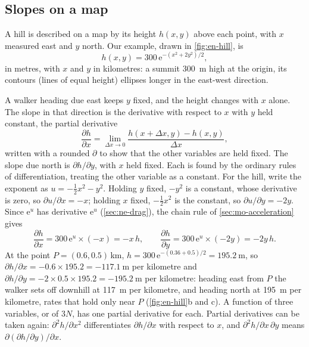 \subsection*{Slopes on a map}

A hill is described on a map by its height $h(x, y)$ above each point,
with $x$ measured east and $y$ north. Our example, drawn in
\cref{fig:en-hill}, is
\begin{equation*}
   h(x, y) = 300\,\mathrm{e}^{-(x^2 + 2y^2)/2} ,
\end{equation*}
in metres, with $x$ and $y$ in kilometres: a summit \SI{300}{\metre} high
at the origin, its contours (lines of equal height) ellipses longer in
the east-west direction.

\begin{toolbox}
A walker heading due east keeps $y$ fixed, and the height changes with
$x$ alone. The slope in that direction is the derivative with respect to
$x$ with $y$ held constant, the partial derivative
\begin{equation*}
   \frac{\partial h}{\partial x}
   = \lim_{\Delta x\to0}\frac{h(x + \Delta x, y) - h(x, y)}{\Delta x} ,
\end{equation*}
written with a rounded $\partial$ to show that the other variables are
held fixed. The slope due north is $\partial h/\partial y$, with $x$ held
fixed. Each is found by the ordinary rules of differentiation, treating
the other variable as a constant. For the hill, write the exponent as $u
= -\tfrac12 x^2 - y^2$. Holding $y$ fixed, $-y^2$ is a constant, whose
derivative is zero, so $\partial u/\partial x = -x$; holding $x$ fixed,
$-\tfrac12 x^2$ is the constant, so $\partial u/\partial y = -2y$. Since
$\mathrm{e}^u$ has derivative $\mathrm{e}^u$ (\cref{sec:ne-drag}), the
chain rule of \cref{sec:mo-acceleration} gives
\begin{equation*}
   \frac{\partial h}{\partial x} = 300\,\mathrm{e}^{u}\times(-x) = -x\,h ,
   \qquad
   \frac{\partial h}{\partial y} = 300\,\mathrm{e}^{u}\times(-2y)
   = -2y\,h .
\end{equation*}
At the point $P = (0.6, 0.5)$\,\si{\kilo\metre}, $h =
300\,\mathrm{e}^{-(0.36 + 0.5)/2} = \SI{195.2}{\metre}$, so $\partial
h/\partial x = -0.6\times195.2 = \SI{-117.1}{\metre}$ per kilometre and
$\partial h/\partial y = -2\times0.5\times195.2 = \SI{-195.2}{\metre}$
per kilometre: heading east from $P$ the walker sets off downhill at
\SI{117}{\metre} per kilometre, and heading north at \SI{195}{\metre} per
kilometre, rates that hold only near $P$ (\cref{fig:en-hill}b and c). A function of three variables, or of $3N$,
has one partial derivative for each. Partial derivatives can be taken
again: $\partial^2 h/\partial x^2$ differentiates $\partial h/\partial x$
with respect to $x$, and $\partial^2 h/\partial x\,\partial y$ means
$\partial(\partial h/\partial y)/\partial x$.
\end{toolbox}

